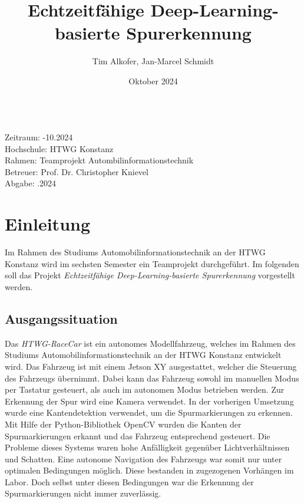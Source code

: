 \documentclass{article}
\title{Echtzeitfähige Deep-Learning-basierte Spurerkennung}
\author{Tim Alkofer, Jan-Marcel Schmidt}
\date{Oktober 2024} %
\begin{document}
    
    \maketitle
    
    \begin{tabbing}
    \hspace{5em} \= \\
        Zeitraum: -10.2024 \\ %
        Hochschule: \> HTWG Konstanz \\
        Rahmen: \> Teamprojekt Autombilinformationstechnik \\
        Betreuer: \> Prof. Dr. Christopher Knievel \\
        Abgabe: .2024 \\ %
    \end{tabbing}

    \clearpage
    \tableofcontents
    \clearpage
    \listoffigures
    \clearpage
    
    
    \clearpage

    \section{Einleitung}
        Im Rahmen des Studiums Automobilinformationstechnik an der HTWG Konstanz wird im sechsten Semester ein Teamprojekt durchgeführt.
        Im folgenden soll das Projekt \textit{Echtzeitfähige Deep-Learning-basierte Spurerkennung} vorgestellt werden.

        \subsection{Ausgangssituation}
            Das \textit{HTWG-RaceCar} ist ein autonomes Modellfahrzeug, welches im Rahmen des Studiums Automobilinformationstechnik an der HTWG Konstanz entwickelt wird.
            Das Fahrzeug ist mit einem Jetson XY
            ausgestattet, welcher die Steuerung des Fahrzeugs übernimmt.
            Dabei kann das Fahrzeug sowohl im manuellen Modus per Tastatur gesteuert, als auch im autonomen Modus betrieben werden.
            Zur Erkennung der Spur wird eine Kamera verwendet. %
            In der vorherigen Umsetzung wurde eine Kantendetektion verwendet, um die Spurmarkierungen zu erkennen.
            Mit Hilfe der Python-Bibliothek OpenCV wurden die Kanten der Spurmarkierungen erkannt und das Fahrzeug entsprechend gesteuert.
            Die Probleme dieses Systems waren hohe Anfälligkeit gegenüber Lichtverhältnissen und Schatten.
            Eine autonome Navigation des Fahrzeugs war somit nur unter optimalen Bedingungen möglich. Diese bestanden in zugezogenen Vorhängen im Labor.
            Doch selbst unter diesen Bedingungen war die Erkennung der Spurmarkierungen nicht immer zuverlässig.
\end{document}
